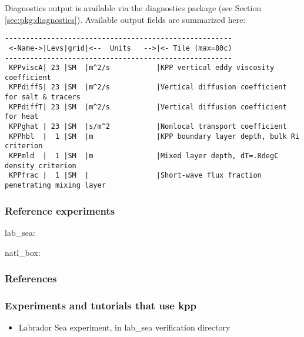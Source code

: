 Diagnostics output is available via the diagnostics package
(see Section \ref{sec:pkg:diagnostics}).
Available output fields are summarized here:

\begin{verbatim}
------------------------------------------------------
 <-Name->|Levs|grid|<--  Units   -->|<- Tile (max=80c)
------------------------------------------------------
 KPPviscA| 23 |SM  |m^2/s           |KPP vertical eddy viscosity coefficient
 KPPdiffS| 23 |SM  |m^2/s           |Vertical diffusion coefficient for salt & tracers
 KPPdiffT| 23 |SM  |m^2/s           |Vertical diffusion coefficient for heat
 KPPghat | 23 |SM  |s/m^2           |Nonlocal transport coefficient
 KPPhbl  |  1 |SM  |m               |KPP boundary layer depth, bulk Ri criterion
 KPPmld  |  1 |SM  |m               |Mixed layer depth, dT=.8degC density criterion
 KPPfrac |  1 |SM  |                |Short-wave flux fraction penetrating mixing layer
\end{verbatim}


\subsubsection{Reference experiments}

lab\_sea:

natl\_box:


\subsubsection{References}

\subsubsection{Experiments and tutorials that use kpp}
\label{sec:pkg:kpp:experiments}

\begin{itemize}
\item{Labrador Sea experiment, in lab\_sea verification directory }
\end{itemize}
